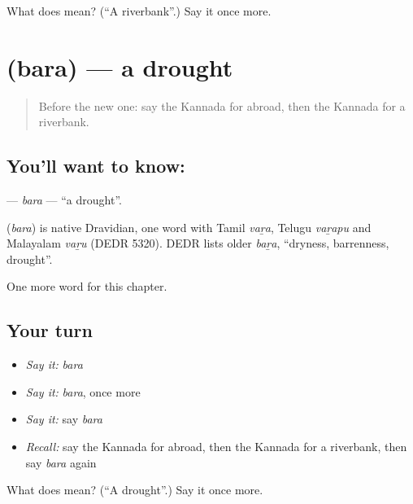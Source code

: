 \begin{tcolorbox}[breakable,colback=teal!4,colframe=teal!35!black,title={Before you move on}]
What does  mean? (\textquotedblleft{}A riverbank\textquotedblright{}.) Say it once more.
\end{tcolorbox}
\section[\texorpdfstring{\kn{ಬರ} (bara)}{ಬರ (bara)}]{ (bara) — a drought}

\label{lesson:KA-C287-bara}



\begin{quote}
Before the new one: say the Kannada for abroad, then the Kannada for a riverbank.
\end{quote}

\subsection*{You'll want to know: }
\textbf{} — \emph{bara} — \textquotedblleft{}a drought\textquotedblright{}.

\begin{cousinweb}
\textbf{} (\emph{bara}) is native Dravidian, one word with Tamil \emph{vaṟa}, Telugu \emph{vaṟapu} and Malayalam \emph{vaṟu} (DEDR 5320). DEDR lists older \emph{baṟa}, \textquotedblleft{}dryness, barrenness, drought\textquotedblright{}.
\end{cousinweb}

\begin{grammarlens}[title={What you've built}]
One more word for this chapter.
\end{grammarlens}

\subsection*{Your turn}
\begin{itemize}
\raggedright
  \item \emph{Say it:} \emph{bara}
  \item \emph{Say it:} \emph{bara}, once more
  \item \emph{Say it:} say \emph{bara}
  \item \emph{Recall:} say the Kannada for abroad, then the Kannada for a riverbank, then say \emph{bara} again
\end{itemize}

\begin{tcolorbox}[breakable,colback=teal!4,colframe=teal!35!black,title={Before you move on}]
What does  mean? (\textquotedblleft{}A drought\textquotedblright{}.) Say it once more.
\end{tcolorbox}
